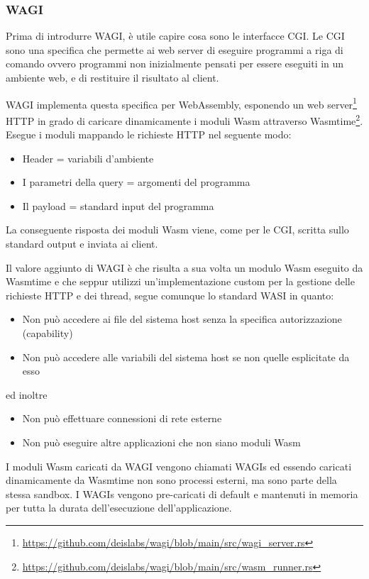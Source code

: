 \subsubsection{WAGI}
Prima di introdurre WAGI, è utile capire cosa sono le interfacce CGI. Le CGI sono una specifica che permette ai web
server di eseguire programmi a riga di comando ovvero programmi non inizialmente pensati per essere eseguiti in un
ambiente web, e di restituire il risultato al client.

WAGI implementa questa specifica per WebAssembly, esponendo un web
server\footnote{\url{https://github.com/deislabs/wagi/blob/main/src/wagi_server.rs}} HTTP in grado di caricare
dinamicamente i moduli Wasm attraverso
Wasmtime\footnote{\url{https://github.com/deislabs/wagi/blob/main/src/wasm_runner.rs}}. Esegue i moduli mappando le
richieste HTTP nel seguente modo:
\begin{itemize}
    \item Header = variabili d'ambiente
    \item I parametri della query = argomenti del programma
    \item Il payload = standard input del programma
\end{itemize}

La conseguente risposta dei moduli Wasm viene, come per le CGI, scritta sullo standard output e inviata ai client.

Il valore aggiunto di WAGI è che risulta a sua volta un modulo Wasm eseguito da Wasmtime e che seppur utilizzi
un'implementazione custom per la gestione delle richieste HTTP e dei thread, segue comunque lo standard WASI in quanto:
\begin{itemize}
    \item Non può accedere ai file del sistema host senza la specifica autorizzazione (capability)
    \item Non può accedere alle variabili del sistema host se non quelle esplicitate da esso
\end{itemize}
ed inoltre
\begin{itemize}
    \item Non può effettuare connessioni di rete esterne
    \item Non può eseguire altre applicazioni che non siano moduli Wasm
\end{itemize}

I moduli Wasm caricati da WAGI vengono chiamati WAGIs ed essendo caricati dinamicamente da Wasmtime non sono processi
esterni, ma sono parte della stessa sandbox. I WAGIs vengono pre-caricati di default e mantenuti in memoria per tutta la
durata dell'esecuzione dell'applicazione.

